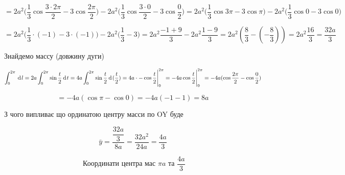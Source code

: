 $$
= 2a^2 \Bigg( \dfrac{1}{3} \cos{\dfrac{3 \cdot 2\pi }{2}} -3 \cos{\dfrac{2\pi}{2}}  \Bigg) - 2a^2 \Bigg( \dfrac{1}{3} \cos{\dfrac{3 \cdot 0 }{2}} -3 \cos{\dfrac{0}{2}}  \Bigg)
= 2a^2 \Bigg( \dfrac{1}{3} \cos{3\pi} -3 \cos{\pi}  \Bigg) - 2a^2 \Bigg( \dfrac{1}{3} \cos{0} -3 \cos{0}  \Bigg)
$$

$$
= 2a^2 \Bigg( \dfrac{1}{3} \cdot (-1)  -3 \cdot (-1)  \Bigg) - 2a^2 \Bigg( \dfrac{1}{3}  -3 \Bigg)
= 2a^2 \dfrac{-1+9}{3} - 2a^2 \dfrac{1-9}{3} = 2a^2 (\dfrac{8}{3}-(-\dfrac{8}{3}))
= 2a^2 \dfrac{16}{3}
= \dfrac{32a}{3}
$$

Знайдемо массу (довжину дуги)

$$
 \int_0^{2\pi}  \hspace{2pt}\text{d}\hspace{1pt}{l}
= 2a \int_0^{2\pi}  \sin{\dfrac{t}{2}}\hspace{2pt}\text{d}\hspace{1pt}{t}
= 4a \int_0^{2\pi}  \sin{\dfrac{t}{2}}\hspace{2pt}\text{d}\hspace{1pt}{(\dfrac{t}{2})}
= 4a \cdot -\cos{\dfrac{t}{2}} \Bigg|_0^{2\pi}
= -4a \cos{\dfrac{t}{2}} \Bigg|_0^{2\pi}
= -4a(\cos{\dfrac{2\pi}{2}}-\cos{\dfrac{0}{2}})
$$

$$
= -4a(\cos{\pi}-\cos{0})
= -4a(-1-1)
= 8a
$$

З чого випливає що ординатою центру масси по OY буде

$$
 \bar{y} = \dfrac{\dfrac{32a}{3}}{8a} = \dfrac{32a^2}{24a}= \dfrac{4a}{3}
$$

$$
\boxed{ {\text{ Координати центра мас }} \pi{a} {\text{ та }} \dfrac{4a}{3}}
$$

